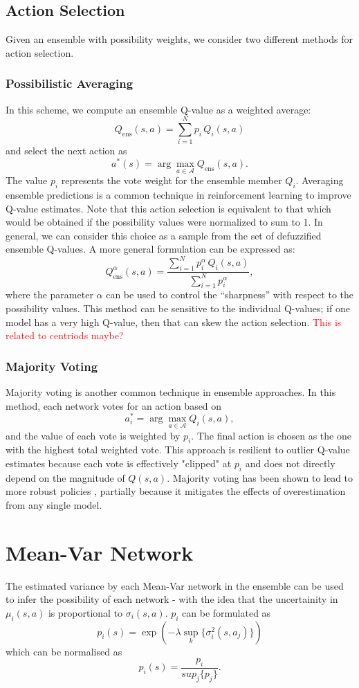 \documentclass[12pt,a4paper]{report}
\newcommand\myworries[1]{\textcolor{red}{#1}}
\begin{document}
\subsection{Action Selection}
Given an ensemble with possibility weights, we consider two different methods for action selection.

\subsubsection{Possibilistic Averaging}
In this scheme, we compute an ensemble Q-value as a weighted average:
\[
  Q_{\text{ens}}(s,a) = \sum_{i=1}^N p_i\, Q_i(s,a)
\]
and select the next action as
\[
  a^*(s) = \arg \max_{a \in \mathcal{A}} Q_{\text{ens}}(s,a).
\]
The value \(p_i\) represents the vote weight for the ensemble member \(Q_i\). Averaging ensemble predictions is a common technique in reinforcement learning to improve Q-value estimates. Note that this action selection is equivalent to that which would be obtained if the possibility values were normalized to sum to 1. In general, we can consider this choice as a sample from the set of defuzzified ensemble Q-values. A more general formulation can be expressed as:
\[
  Q_{\text{ens}}^\alpha(s,a) = \frac{\sum_{i=1}^N p_i^\alpha \, Q_i(s,a)}{\sum_{i=1}^N p_i^\alpha},
\]
where the parameter \(\alpha\) can be used to control the “sharpness” with respect to the possibility values. This method can be sensitive to the individual Q-values; if one model has a very high Q-value, then that can skew the action selection. \myworries{This is related to centriods maybe?}

\subsubsection{Majority Voting}
Majority voting is another common technique in ensemble approaches. In this method, each network votes for an action based on
\[
  a_i^* = \arg \max_{a \in \mathcal{A}} Q_i(s,a),
\]
and the value of each vote is weighted by \(p_i\). The final action is chosen as the one with the highest total weighted vote. This approach is resilient to outlier Q-value estimates because each vote is effectively "clipped" at \(p_i\) and does not directly depend on the magnitude of \(Q(s,a)\). Majority voting has been shown to lead to more robust policies \cite{Hans2010}, partially because it mitigates the effects of overestimation from any single model.

\section{Mean-Var Network}
The estimated variance by each Mean-Var network in the ensemble can be used to infer the possibility of each network - with the idea that the uncertainity in $\mu_i(s,a)$ is proportional to $\sigma_i(s,a)$. $p_i$ can be formulated as 
\[
  p_i(s) = \exp(-\lambda \sup_k\{\sigma_i^2(s,a_j)\})
\]
which can be normalised as 
\[
  p_i(s) = \frac{p_i}{sup_j\{p_j\}}.
\]
\end{document}
